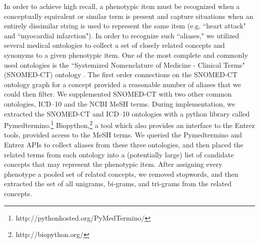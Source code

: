 \documentclass{sig-alternate}
\begin{document}

In order to achieve high recall, a phenotypic item must be recognized when a conceptually equivalent or similar term is present and capture situations when an entirely dissimilar string is used to represent the same item  (e.g. ``heart attack" and ``myocardial infarction").
In order to recognize such ``aliases," we utilized several medical ontologies to collect a set of closely related concepts and synonyms to a given phenotypic item.
One of the most complete and commonly used ontologies is the ``Systemized Nomenclature of Medicine - Clinical Terms" (SNOMED-CT) ontology \cite{Wasserman2003}. The first order connections on the SNOMED-CT ontology graph for a concept provided a reasonable number of aliases that we could then filter.
We supplemented SNOMED-CT with two other common ontologies, ICD--10 and the NCBI MeSH terms.
During implementation, we extracted the SNOMED-CT and ICD--10 ontologies with a python library called Pymedtermino.\footnote{http://pythonhosted.org/PyMedTermino/}
Biopython,\footnote{http://biopython.org/} a tool which also provides an interface to the Entrez tools, provided access to the MeSH terms.
We queried the Pymedtermino and Entrez APIs to collect aliases from these three ontologies, and then placed the related terms from each ontology into a (potentially large) list of candidate concepts that may represent the phenotypic item.
After assigning every phenotype a pooled set of related concepts, we removed stopwords, and then extracted the set of all unigrams, bi-grams, and tri-grams from the related concepts.
\end{document}
